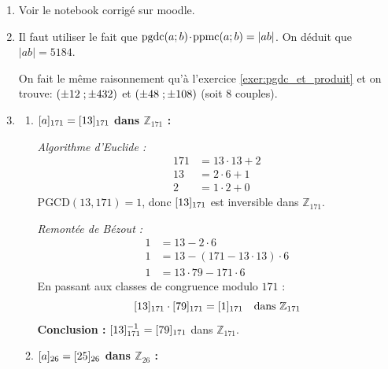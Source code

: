 \begin{enumerate}[label=\thechapter.\arabic*, font=\bfseries, itemsep=7mm,labelsep*=3mm,left=0mm]
\begin{enumerate}[label=\textbf{\alph*)}, leftmargin=*]
\begin{enumerate}[label=\textbf{\arabic*)}, leftmargin=*]
		\item $a \cdot b = 2352$ et $\text{PPCM}(a,b) = 168$ :
		\[
		\text{PGCD}(a,b) = \frac{a \cdot b}{\text{PPCM}(a,b)} = \frac{2352}{168} = 14
		\]
		Posons $a = 14a'$ et $b = 14b'$ avec $\text{PGCD}(a', b') = 1$.
		\[
		\text{PPCM}(a,b) = 14 \cdot a' \cdot b' = 168 \implies a' \cdot b' = 12
		\]
		Les couples d'entiers premiers entre eux $(a',b')$ tels que $a'b' = 12$ sont $(1,12), (3,4), (4,3), (12,1)$.
		D'où les solutions $(a,b) \in \{(14, 168), (42, 56), (56, 42), (168, 14)\}$.
	\end{enumerate}
\end{enumerate}


\item Voir le notebook corrigé sur moodle.

\item
Il faut utiliser le fait que $\pgdc(a;b)\fois \ppmc(a;b)=\vert ab\vert$. On déduit que $\vert ab\vert=5184$.


\smallskip
On fait le même raisonnement qu'à l'exercice \ref*{exer:pgdc_et_produit} et on trouve: $\pt{\pm 12}{\pm 432}$ et $\pt{\pm 48}{\pm 108}$ {\small (soit $8$ couples)}. 


\item
\begin{enumerate}[label=\textbf{\arabic*)}, leftmargin=*]
	\item \textbf{$\cl[171]{a} = \cl[171]{13}$ dans $\mathbb{Z}_{171}$ :}
	
	\textit{Algorithme d'Euclide :}
	\begin{align*}
		171 &= 13 \cdot 13 + 2 \\
		13 &= 2 \cdot 6 + 1 \\
		2 &= 1 \cdot 2 + 0
	\end{align*}
	$\text{PGCD}(13, 171) = 1$, donc $\cl[171]{13}$ est inversible dans $\mathbb{Z}_{171}$.
	
	\textit{Remontée de Bézout :}
	\begin{align*}
		1 &= 13 - 2 \cdot 6 \\
		1 &= 13 - (171 - 13 \cdot 13) \cdot 6 \\
		1 &= 13 \cdot 79 - 171 \cdot 6
	\end{align*}
	En passant aux classes de congruence modulo $171$ :
	\[
	\cl[171]{13} \cdot \cl[171]{79} = \cl[171]{1} \quad \text{dans } \mathbb{Z}_{171}
	\]
	\textbf{Conclusion :} $\cl[171]{13}^{-1} = \cl[171]{79}$ dans $\mathbb{Z}_{171}$.
	
	\item \textbf{$\cl[26]{a} = \cl[26]{25}$ dans $\mathbb{Z}_{26}$ :}
	

\end{enumerate}
\end{enumerate}
